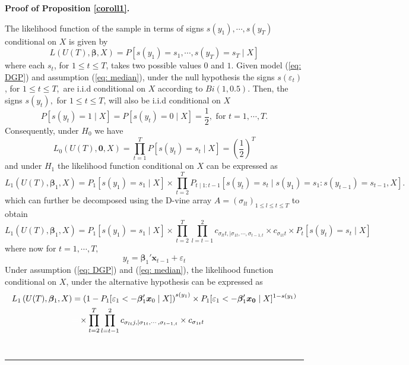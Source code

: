 \documentclass[harvard,11pt]{article}
\newenvironment{proof}[1][Proof]{\textbf{#1.} }{\  \rule{0.5em}{0.5em}}
\begin{document}
\begin{proof}[Proof of Proposition \protect\ref{coroll1}]

The likelihood function of the sample in terms of signs $s(y_{1}),\cdots,s(y_{T})$ conditional on $X$ is given by%
\begin{equation*}
L\left( U(T),\bm{\beta},X \right) =P\left[s(y_{1})=s_{1},\cdots,s(y_{T})=s_{T}\mid X\right] 
\end{equation*}%
where each $s_{t}$, for $1\leq t\leq T$, takes two possible values $0$ and $%
1 $. Given model (\ref{eq: DGP}) and assumption (\ref{eq: median}), under the null hypothesis the signs $s(\varepsilon_{t})$, for $1\leq t\leq T$,\ are i.i.d conditional on $X$ according to $Bi(1,0.5)$. Then, the signs $s(y_{t}),$ for $1\leq t\leq T$, will also be i.i.d conditional on $X$
\begin{equation*}
P\left[ s(y_{t})=1\mid X\right] =P\left[ s(y_{t})=0\mid X\right] =%
\frac{1}{2},\text{ for }t=1,\cdots,T.
\end{equation*}%
Consequently, under $H_0$ we have
\begin{equation*}
L_{0}\left( U(T),\bm{0},X\right) =\prod\limits_{t=1}^{T}
P\left[s(y_{t})=s_{t}\mid X\right] =\left( \frac{1}{2}\right) ^{T}
\end{equation*}%
and under $H_1$ the likelihood function conditional on $X$ can be expressed as 
\[
L_1\left( U(T),\bm{\beta}_1,X \right) =P_1[s(y_1)=s_1\mid X]\times\prod\limits_{t=2}^{T}P_{t\mid 1:{t-1}}[s(y_t)=s_t\mid s(y_1)=s_1:s(y_{t-1})=s_{t-1},X].
\]
which can further be decomposed using the D-vine array $A=(\sigma_{lt})_{1\leq l\leq t\leq T}$ to obtain
\[
L_1\left( U(T),\bm{\beta}_1,X \right) =P_1[s(y_1)=s_1\mid X]\times\prod\limits_{t=2}^{T}\prod\limits_{l=t-1}^{2} c_{\sigma_{lt}t,\mid \sigma_{1t},\cdots,\sigma_{t-1,t}}\times c_{\sigma_{1t}t}\times P_t[s(y_t)=s_t\mid X]
\]
where now for $t=1,\cdots,T,$%
\begin{equation*}
y_{t}=\bm{\beta}_1'\bm{x}_{t-1}+\varepsilon_{t}
\end{equation*}%
Under assumption (\ref{eq: DGP}) and (\ref{eq: median}), the likelihood function conditional on $X$, under the alternative hypothesis can be expressed as 
\begingroup
\allowdisplaybreaks
\begin{align*}
L_1\left( U(T),\bm{\beta}_1,X \right)& =\left(1-P_1[\varepsilon_1< -\bm{\beta}_1' \bm{x}_0\mid X]\right)^{s(y_1)}\times P_1[\varepsilon_1 <- \bm{\beta}_1' \bm{x_0}\mid X]^{1-s(y_1)}\\
&\textcolor{white}{=}\times\prod\limits_{t=2}^{T}\prod\limits_{l=t-1}^{2} c_{\sigma_{lt}j,\mid \sigma_{1t},\cdots,\sigma_{t-1,t}}\times c_{\sigma_{1t}t}

\end{align*}
\end{proof}
\end{document}
